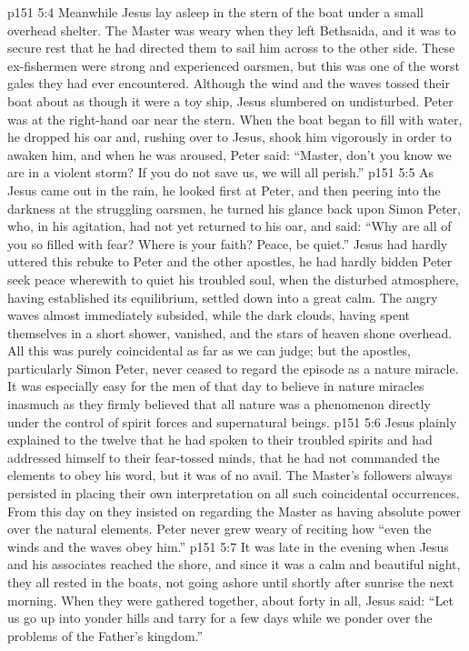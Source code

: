 \vs p151 5:4 Meanwhile Jesus lay asleep in the stern of the boat under a small overhead shelter. The Master was weary when they left Bethsaida, and it was to secure rest that he had directed them to sail him across to the other side. These ex\hyp{}fishermen were strong and experienced oarsmen, but this was one of the worst gales they had ever encountered. Although the wind and the waves tossed their boat about as though it were a toy ship, Jesus slumbered on undisturbed. Peter was at the right\hyp{}hand oar near the stern. When the boat began to fill with water, he dropped his oar and, rushing over to Jesus, shook him vigorously in order to awaken him, and when he was aroused, Peter said: “Master, don’t you know we are in a violent storm? If you do not save us, we will all perish.”
\vs p151 5:5 As Jesus came out in the rain, he looked first at Peter, and then peering into the darkness at the struggling oarsmen, he turned his glance back upon Simon Peter, who, in his agitation, had not yet returned to his oar, and said: \textcolor{ubdarkred}{“Why are all of you so filled with fear? Where is your faith? Peace, be quiet.”} Jesus had hardly uttered this rebuke to Peter and the other apostles, he had hardly bidden Peter seek peace wherewith to quiet his troubled soul, when the disturbed atmosphere, having established its equilibrium, settled down into a great calm. The angry waves almost immediately subsided, while the dark clouds, having spent themselves in a short shower, vanished, and the stars of heaven shone overhead. All this was purely coincidental as far as we can judge; but the apostles, particularly Simon Peter, never ceased to regard the episode as a nature miracle. It was especially easy for the men of that day to believe in nature miracles inasmuch as they firmly believed that all nature was a phenomenon directly under the control of spirit forces and supernatural beings.
\vs p151 5:6 Jesus plainly explained to the twelve that he had spoken to their troubled spirits and had addressed himself to their fear\hyp{}tossed minds, that he had not commanded the elements to obey his word, but it was of no avail. The Master’s followers always persisted in placing their own interpretation on all such coincidental occurrences. From this day on they insisted on regarding the Master as having absolute power over the natural elements. Peter never grew weary of reciting how “even the winds and the waves obey him.”\plusone
\vs p151 5:7 It was late in the evening when Jesus and his associates reached the shore, and since it was a calm and beautiful night, they all rested in the boats, not going ashore until shortly after sunrise the next morning. When they were gathered together, about forty in all, Jesus said: \textcolor{ubdarkred}{“Let us go up into yonder hills and tarry for a few days while we ponder over the problems of the Father’s kingdom.”}
